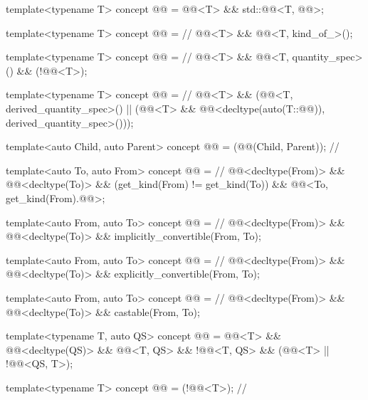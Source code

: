 \begin{itemdecl}
template<typename T>
concept @@ = @@<T> && std::@@<T, @@>;

template<typename T>
concept @@ =                                   // \expos
  @@<T> && @@<T, kind_of_>();

template<typename T>
concept @@ =                                  // \expos
  @@<T> && @@<T, quantity_spec>() &&
  (!@@<T>);

template<typename T>
concept @@ =                                // \expos
  @@<T> &&
  (@@<T, derived_quantity_spec>() ||
   (@@<T> &&
    @@<decltype(auto(T::@@)), derived_quantity_spec>()));

template<auto Child, auto Parent>
concept @@ = (@@(Child, Parent));  // \expos

template<auto To, auto From>
concept @@ =                           // \expos
  @@<decltype(From)> && @@<decltype(To)> &&
  (get_kind(From) != get_kind(To)) && @@<To, get_kind(From).@@>;

template<auto From, auto To>
concept @@ =                          // \expos
  @@<decltype(From)> && @@<decltype(To)> && implicitly_convertible(From, To);

template<auto From, auto To>
concept @@ =                // \expos
  @@<decltype(From)> && @@<decltype(To)> && explicitly_convertible(From, To);

template<auto From, auto To>
concept @@ =                             // \expos
  @@<decltype(From)> && @@<decltype(To)> && castable(From, To);

template<typename T, auto QS>
concept @@ =
  @@<T> && @@<decltype(QS)> && @@<T{}, QS> &&
  !@@<T{}, QS> &&
  (@@<T> || !@@<QS, T{}>);

template<typename T>
concept @@ = (!@@<T>);                     // \expos
\end{itemdecl}

